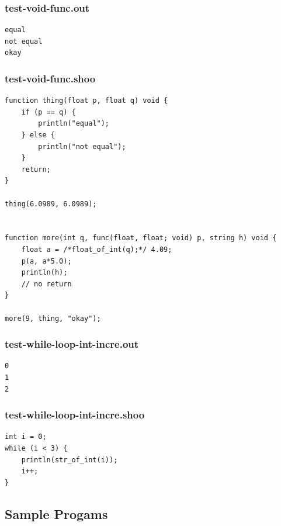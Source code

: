 \documentclass[12pt]{article}
\begin{document}
\subsubsection{test-void-func.out}
\begin{mdframed}[hidealllines=true,backgroundcolor=green!10]
\begin{lstlisting}
equal
not equal
okay
\end{lstlisting}
\end{mdframed}
\subsubsection{test-void-func.shoo}
\begin{mdframed}[hidealllines=true,backgroundcolor=blue!10]
\begin{lstlisting}
function thing(float p, float q) void {
    if (p == q) {
        println("equal");
    } else {
        println("not equal");
    }
    return;
}

thing(6.0989, 6.0989);


function more(int q, func(float, float; void) p, string h) void {
    float a = /*float_of_int(q);*/ 4.09;
    p(a, a*5.0);
    println(h);
    // no return
}

more(9, thing, "okay");
\end{lstlisting}
\end{mdframed}
\subsubsection{test-while-loop-int-incre.out}
\begin{mdframed}[hidealllines=true,backgroundcolor=green!10]
\begin{lstlisting}
0
1
2
\end{lstlisting}
\end{mdframed}
\subsubsection{test-while-loop-int-incre.shoo}
\begin{mdframed}[hidealllines=true,backgroundcolor=blue!10]
\begin{lstlisting}
int i = 0;
while (i < 3) {
    println(str_of_int(i));
    i++;
}\end{lstlisting}
\end{mdframed}

\subsection{Sample Progams}
\end{document}
